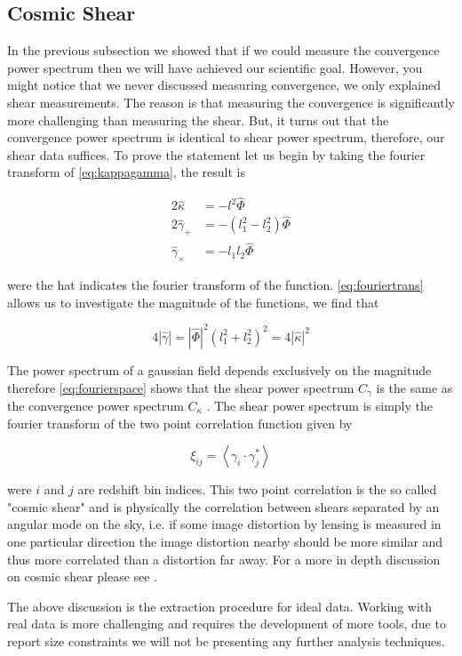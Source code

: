 \subsection{Cosmic Shear}
In the previous subsection we showed that if we could measure the convergence power spectrum then we will have achieved our scientific goal. However, you might notice that we never discussed measuring convergence, we only explained shear measurements. The reason is that measuring the convergence is significantly more challenging than measuring the shear. But, it turns out that the convergence power spectrum is identical to shear power spectrum, therefore, our shear data suffices. To prove the statement let us begin by taking the fourier transform of \autoref{eq:kappagamma}, the result is 

\begin{equation}
    \begin{split}
        2\hat{\kappa} &= -l^2 \hat{\Phi} \\
        2 \hat{\gamma}_+ &= -(l_1^2-l_2^2) \hat{\Phi} \\
        \hat{\gamma}_\times &= -l_1l_2 \hat{\Phi}
    \end{split}
    \label{eq:fouriertrans}
\end{equation}

were the hat indicates the fourier transform of the function. \autoref{eq:fouriertrans} allows us to investigate the magnitude of the functions, we find that

\begin{equation}
    4|\hat{\gamma}| = |\hat{\Phi}|^2 \left(l_1^2+l_2^2\right)^2 = 4 |\hat{\kappa}|^2
    \label{eq:fourierspace}
\end{equation}

The power spectrum of a gaussian field depends exclusively on the magnitude therefore \autoref{eq:fourierspace} shows that the shear power spectrum $C_\gamma$ is the same as the convergence power spectrum $C_\kappa$ \cite{Bartelmann:2016dvf,Hoekstra:2013gua,rachel_2018,general_2013}. The shear power spectrum is simply the fourier transform of the two point correlation function given by 

\begin{equation}
    \xi_{ij} = \left< \gamma_i \cdot \gamma_j^*\right> 
    \label{eq:2ptcorrelation}
\end{equation}

were $i$ and $j$ are redshift bin indices. This two point correlation is the so called "cosmic shear" and is physically the correlation between shears separated by an angular mode on the sky, i.e. if some image distortion by lensing is measured in one particular direction the image distortion nearby should be more similar and thus more correlated than a distortion far away. For a more in depth discussion on cosmic shear please see \cite{lensingbook,general_2013,Hoekstra:2013gua,Bartelmann:2016dvf}.

 \par The above discussion is the extraction procedure for ideal data. Working with real data is more challenging and requires the development of more tools, due to report size constraints we will not be presenting any further analysis techniques.
